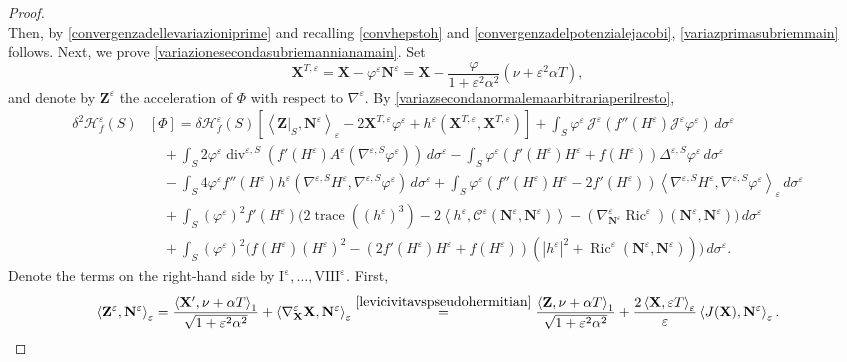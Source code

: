 \documentclass[11pt]{amsart}
\newcommand{\n}[1]{\nabla^\varepsilon_{ #1 }}
\newcommand{\tmc}{{\mathscr{H}}}
\newcommand{\vh}{\nu}
\newcommand{\eps}{\varepsilon}
\renewcommand{\j}{\mathcal{C}}
\newcommand{\X}{\mathbf{X}}
\newcommand{\Z}{\mathbf{Z}}
\renewcommand{\n}{\mathbf{N}}
\DeclareMathOperator{\ric}{Ric}
\DeclareMathOperator{\divv}{div}
\DeclareMathOperator{\trace}{trace}
\newcommand{\jacobi}{\mathcal{J}}
\theoremstyle{definition}
\theoremstyle{remark}
\numberwithin{equation}{section}
\begin{document}
\begin{proof}
\begin{equation*}
    \end{equation*}
    Then, by \eqref{convergenzadellevariazioniprime} and recalling \eqref{convhepstoh} and \eqref{convergenzadelpotenzialejacobi}, \eqref{variazprimasubriemmain} follows. Next, we prove \eqref{variazionesecondasubriemannianamain}. Set $$\X^{T,\eps}=\X-\varphi^\eps\n^\eps=\X-\frac{\varphi}{1+\eps^2\alpha^2}\left(\vh+\eps^2\alpha T\right),$$ and denote by $\Z^\eps$ the acceleration of $\Phi$ with respect to $\nabla^\eps$.
 By \eqref{variazsecondanormalemaarbitrariaperilresto}, 
   \begin{equation*}
        \begin{split}
            \delta^2\tmc^\eps_f(S)&[\Phi]=\delta\tmc^\eps_f(S)\left[\left\langle\Z|_S,\n^\eps\right\rangle_\eps-2\X^{T,\eps}\varphi^\eps +h^\eps\left(\X^{T,\eps},\X^{T,\eps}\right)\right]+\int_S\varphi^\eps\,\jacobi^\eps\left(f''(H^\eps)\jacobi^\eps\varphi^\eps\right)\,d\sigma^\eps\\
            &\quad+\int_S2\varphi^\eps \divv^{\eps,S} \left(f'(H^\eps)A^\eps\left(\nabla^{\eps,S}\varphi^\eps\right)\right)\,d\sigma^\eps-\int_S\varphi^\eps\left(f'(H^\eps)H^\eps+f(H^\eps)\right)\Delta^{\eps,S}\varphi^\eps\,d\sigma^\eps\\
            &\quad-\int_S4\varphi ^\eps f''(H^\eps)h^\eps\left(\nabla^{\eps,S} H^\eps,\nabla^{\eps,S}\varphi^\eps\right)\,d\sigma^\eps+\int_S\varphi^\eps\left(f''(H^\eps)H^\eps-2f'(H^\eps)\right)\left\langle \nabla^{\eps,S} H^\eps,\nabla^{\eps,S}\varphi^\eps\right\rangle_\eps\,d\sigma^\eps\\
            &\quad+\int_S\left(\varphi ^\eps\right)^2f'(H^\eps)\Big(2\trace\left(\left(h^\eps\right)^3\right)-2\left\langle h^\eps,\j^\eps(\n^\eps,\n^\eps)\right\rangle-\left(\nabla^\eps_{\n^\eps} \ric^\eps\right)(\n^\eps,\n^\eps)\Big)\,d\sigma^\eps\\
            &\quad+\int_S\left(\varphi^\eps\right)^2 \Big ( f(H^\eps)\left( H^\eps\right)^2-\left(2f'(H^\eps) H^\eps+f(H^\eps)\right)\left(|h^\eps|^2+ \ric^\eps(\n^\eps,\n^\eps)\right)\Big)\,d\sigma ^\eps.
        \end{split}
    \end{equation*}
    Denote the terms on the right-hand side by $\mathrm{I^\eps},\ldots,\mathrm{VIII^\eps}$. First, 
    \begin{equation*}
        \left\langle\Z^\eps,\n^\eps\right\rangle_\eps=\frac{\left\langle\X',\vh+\alpha T\right\rangle_1}{\sqrt{1+\eps^2\alpha^2}}+\left\langle \nabla^\eps_\X\X,\n^\eps\right\rangle_\eps\overset{\eqref{levicivitavspseudohermitian}}{=}\frac{\left\langle\Z,\vh+\alpha T\right\rangle_1}{\sqrt{1+\eps^2\alpha^2}}+\frac{2\left\langle\X,\eps T\right\rangle_\eps}{\eps}\left\langle J(\X),\n^\eps\right\rangle_\eps.

\end{equation*}
\end{proof}
\end{document}
